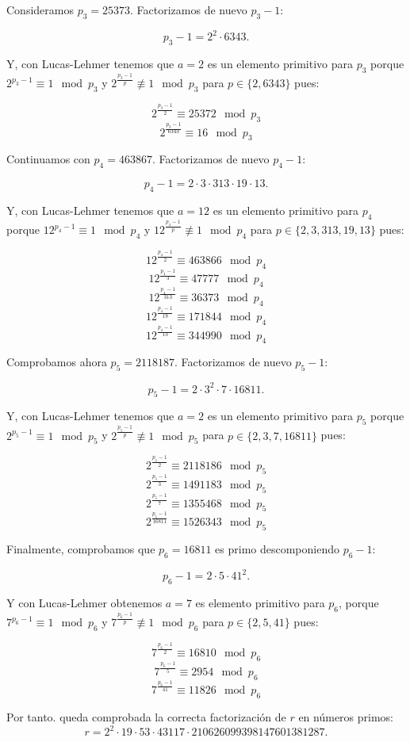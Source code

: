 \documentclass[a4paper]{article}
\begin{document}
Consideramos $p_3=25373$. Factorizamos de nuevo $p_3-1$:

$$p_3-1=2^2\cdot 6343.$$

Y, con Lucas-Lehmer tenemos que $a=2$ es un elemento primitivo para $p_3$ porque $2^{p_3-1}\equiv 1\mod p_3$ y $2^{\frac{p_3-1}{p}}\not\equiv 1\mod p_3 $ para $p\in\{2, 6343\}$ pues:

$$2^{\frac{p_3-1}{2}}\equiv 25372\mod p_3$$
$$2^{\frac{p_3-1}{6343}}\equiv 16\mod p_3$$

Continuamos con $p_4=463867$. Factorizamos de nuevo $p_4-1$:

$$p_4-1=2\cdot 3\cdot 313 \cdot 19\cdot 13.$$

Y, con Lucas-Lehmer tenemos que $a=12$ es un elemento primitivo para $p_4$ porque $12^{p_4-1}\equiv 1\mod p_4$ y $12^{\frac{p_4-1}{p}}\not\equiv 1\mod p_4 $ para $p\in\{2, 3, 313, 19, 13\}$ pues:

$$12^{\frac{p_4-1}{2}}\equiv 463866 \mod p_4$$
$$12^{\frac{p_4-1}{3}}\equiv 47777 \mod p_4$$
$$12^{\frac{p_4-1}{313}}\equiv 36373 \mod p_4$$
$$12^{\frac{p_4-1}{19}}\equiv 171844 \mod p_4$$
$$12^{\frac{p_4-1}{13}}\equiv 344990 \mod p_4$$

Comprobamos ahora $p_5=2118187$. Factorizamos de nuevo $p_5-1$:

$$p_5-1=2\cdot 3^2\cdot 7 \cdot 16811.$$

Y, con Lucas-Lehmer tenemos que $a=2$ es un elemento primitivo para $p_5$ porque $2^{p_5-1}\equiv 1\mod p_5$ y $2^{\frac{p_5-1}{p}}\not\equiv 1\mod p_5 $ para $p\in\{2, 3, 7, 16811\}$ pues:

$$2^{\frac{p_5-1}{2}}\equiv 2118186 \mod p_5$$
$$2^{\frac{p_5-1}{3}}\equiv 1491183 \mod p_5$$
$$2^{\frac{p_5-1}{7}}\equiv 1355468 \mod p_5$$
$$2^{\frac{p_5-1}{16811}}\equiv 1526343 \mod p_5$$

Finalmente, comprobamos que $p_6=16811$ es primo descomponiendo $p_6-1$:

$$p_6-1=2\cdot 5\cdot 41^2.$$

Y con Lucas-Lehmer obtenemos $a=7$ es elemento primitivo para $p_6$, porque $7^{p_6-1}\equiv 1\mod p_6$ y $7^{\frac{p_6-1}{p}}\not\equiv 1\mod p_6 $ para $p\in\{2, 5, 41\}$ pues:

$$7^{\frac{p_6-1}{2}}\equiv 16810 \mod p_6$$
$$7^{\frac{p_6-1}{5}}\equiv 2954 \mod p_6$$
$$7^{\frac{p_6-1}{41}}\equiv 11826 \mod p_6$$

Por tanto. queda comprobada la correcta factorización de $r$ en números primos:
$$r=2^2\cdot 19\cdot 53\cdot 43117\cdot 210626099398147601381287.$$
\end{document}
